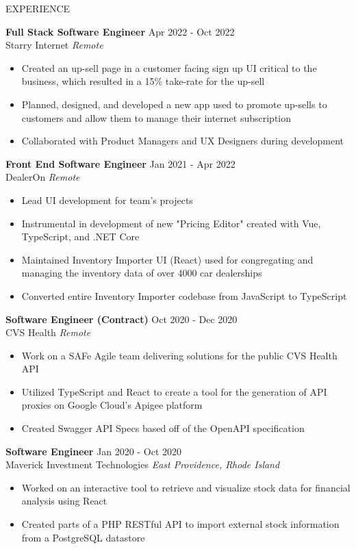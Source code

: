 \documentclass{resume} %
\begin{document}
\begin{rSection}{EXPERIENCE}

\textbf{Full Stack Software Engineer} \hfill  Apr 2022 - Oct 2022\\
Starry Internet \hfill  \textit{Remote}
 \begin{itemize}
    \itemsep -3pt {}
    \item Created an up-sell page in a customer facing sign up UI critical to the business, which resulted in a 15\% take-rate for the up-sell
     \item Planned, designed, and developed a new app used to promote up-sells to customers and allow them to manage their internet subscription
     \item Collaborated with Product Managers and UX Designers during development
 \end{itemize}

\textbf{Front End Software Engineer} \hfill  Jan 2021 - Apr 2022\\
DealerOn \hfill  \textit{Remote}
 \begin{itemize}
    \itemsep -3pt {}
    \item Lead UI development for team's projects
     \item Instrumental in development of new "Pricing Editor" created with Vue, TypeScript, and .NET Core
     \item Maintained Inventory Importer UI (React) used for congregating and managing the inventory data of over 4000 car dealerships
     \item Converted entire Inventory Importer codebase from JavaScript to TypeScript
 \end{itemize}

 \textbf{Software Engineer (Contract)} \hfill  Oct 2020 - Dec 2020\\
CVS Health \hfill \textit{Remote}
 \begin{itemize}
    \itemsep -3pt {} 
     \item Work on a SAFe Agile team delivering solutions for the public CVS Health API 
     \item Utilized TypeScript and React to create a tool for the generation of API proxies on Google Cloud's Apigee platform
     \item Created Swagger API Specs based off of the OpenAPI specification

    
 \end{itemize}

\textbf{Software Engineer} \hfill Jan 2020 - Oct 2020\\
Maverick Investment Technologies \hfill \textit{East Providence, Rhode Island}
 \begin{itemize}
    \itemsep -3pt {} 
    \item Worked on an interactive tool to retrieve and visualize stock data for financial analysis using React
    \item Created parts of a PHP RESTful API to import external stock information from a PostgreSQL datastore 
 \end{itemize}
 
\end{rSection} 
\end{document}
